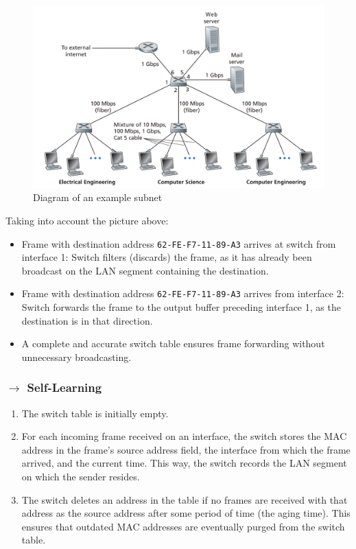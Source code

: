 \begin{figure}[H]
    \centering
    \includegraphics[width = 0.85\linewidth]{img/5/switch-action.png}
    \caption{Diagram of an example subnet}
    \label{fig:switch-action}
\end{figure}

\noindent Taking into account the picture above:
\begin{itemize}
    \item Frame with destination address \texttt{62-FE-F7-11-89-A3} arrives at switch from interface 1: Switch filters (discards) the frame, as it has already been broadcast on the LAN segment containing the destination.
    
    \item Frame with destination address \texttt{62-FE-F7-11-89-A3} arrives from interface 2: Switch forwards the frame to the output buffer preceding interface 1, as the destination is in that direction.
    \item A complete and accurate switch table ensures frame forwarding without unnecessary broadcasting.
\end{itemize}

\subsubsection[5.5.2 Self-Learning]{$\rightarrow$ Self-Learning}

\begin{enumerate}
    \item The switch table is initially empty.

    \item For each incoming frame received on an interface, the switch stores the MAC address in the frame's source address field, the interface from which the frame arrived, and the current time. This way, the switch records the LAN segment on which the sender resides.
    
    \item The switch deletes an address in the table if no frames are received with that address as the source address after some period of time (the aging time). This ensures that outdated MAC addresses are eventually purged from the switch table.
\end{enumerate}

